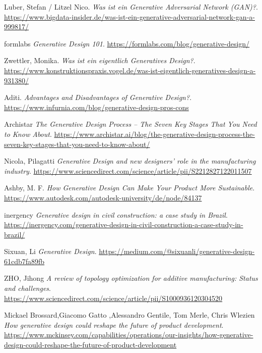 \begin{thebibliography}{99}
     Luber, Stefan / Litzel Nico. \textit{Was ist ein Generative Adversarial Network (GAN)?}. \url{https://www.bigdata-insider.de/was-ist-ein-generative-adversarial-network-gan-a-999817/}

     formlabs \textit{Generative Design 101}. \url{https://formlabs.com/blog/generative-design/}

     Zwettler, Monika. \textit{Was ist ein eigentlich Generatives Design?}. \url{https://www.konstruktionspraxis.vogel.de/was-ist-eigentlich-generatives-design-a-931380/}

     Aditi. \textit{Advantages and Disadvantages of Generative Design?}. \url{https://www.infurnia.com/blog/generative-design-pros-cons}

     Archistar \textit{The Generative Design Process – The Seven Key Stages That You Need to Know About}. \url{https://www.archistar.ai/blog/the-generative-design-process-the-seven-key-stages-that-you-need-to-know-about/}

     Nicola, Pilagatti \textit{Generative Design and new designers’ role in the manufacturing industry}. \url{https://www.sciencedirect.com/science/article/pii/S2212827122011507}
    
     Ashby, M. F. \textit{How Generative Design Can Make Your Product More Sustainable}. \url{https://www.autodesk.com/autodesk-university/de/node/84137}
    
     inergency \textit{Generative design in civil construction: a case study in Brazil}. \url{https://inergency.com/generative-design-in-civil-construction-a-case-study-in-brazil/}

     Sixuan, Li \textit{Generative Design}. \url{    https://medium.com/@sixuanli/generative-design-61cdb7fa89fb}
    
     ZHO, Jihong \textit{A review of topology optimization for additive manufacturing: Status and challenges}. \url{https://www.sciencedirect.com/science/article/pii/S1000936120304520}

     Mickael Brossard,Giacomo Gatto ,Alessandro Gentile, Tom Merle, Chris Wlezien \textit{How generative design could reshape the future of product development}. \url{    https://www.mckinsey.com/capabilities/operations/our-insights/how-generative-design-could-reshape-the-future-of-product-development}


\end{thebibliography}